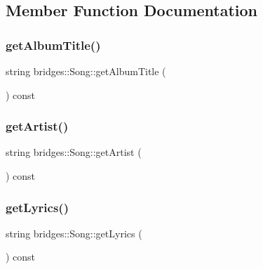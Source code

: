\subsection{Member Function Documentation}
\mbox{\label{classbridges_1_1_song_a1e85190c97eb8d2f9ce37dfbdb9f399b}} 
\subsubsection{\texorpdfstring{getAlbumTitle()}{getAlbumTitle()}}
{\footnotesize\ttfamily string bridges\+::\+Song\+::get\+Album\+Title (\begin{DoxyParamCaption}{ }\end{DoxyParamCaption}) const\hspace{0.3cm}{\ttfamily [inline]}}

\mbox{\label{classbridges_1_1_song_a22175397f3ca65470d4c7081a3d37a13}} 
\subsubsection{\texorpdfstring{getArtist()}{getArtist()}}
{\footnotesize\ttfamily string bridges\+::\+Song\+::get\+Artist (\begin{DoxyParamCaption}{ }\end{DoxyParamCaption}) const\hspace{0.3cm}{\ttfamily [inline]}}

\mbox{\label{classbridges_1_1_song_a54a6ce44a8b553527ba7cb0f8521fb7f}} 
\subsubsection{\texorpdfstring{getLyrics()}{getLyrics()}}
{\footnotesize\ttfamily string bridges\+::\+Song\+::get\+Lyrics (\begin{DoxyParamCaption}{ }\end{DoxyParamCaption}) const\hspace{0.3cm}{\ttfamily [inline]}}

